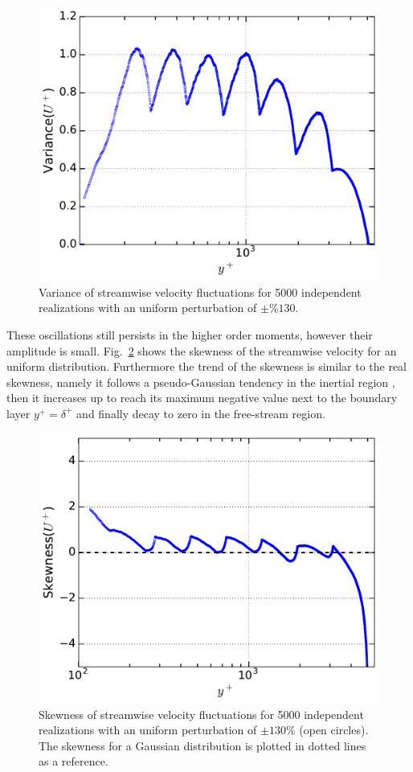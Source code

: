 \documentclass[aps,reprint,amsmath,amssymb,pra]{revtex4-1}%
\begin{document}
\begin{figure}[htb]
\includegraphics[scale=0.46]{figures/variance_5000_assembles_un130}
\caption{\label{fig:varun130} Variance of streamwise velocity fluctuations for 5000 independent realizations with an uniform perturbation of $\pm \%130$.}
\end{figure}     
These oscillations still persists in the higher order moments, however their amplitude is small. Fig.~\ref{fig:skewun130} shows the skewness of the streamwise velocity for an uniform distribution. Furthermore the trend of the skewness is similar to the real skewness, namely it follows a pseudo-Gaussian tendency in the inertial region , then it increases up to reach its maximum negative value next to the boundary layer $y^+=\delta^+$ and finally decay to zero in the free-stream region.
\begin{figure}[tb]
\includegraphics[scale=0.46]{figures/skewness_5000_assembles_un130}
\caption{\label{fig:skewun130} Skewness of streamwise velocity fluctuations for 5000 independent realizations with an uniform perturbation of $\pm 130\%$ (open circles). The skewness for a Gaussian distribution is plotted in dotted lines as a reference.}
\end{figure}
\end{document}
